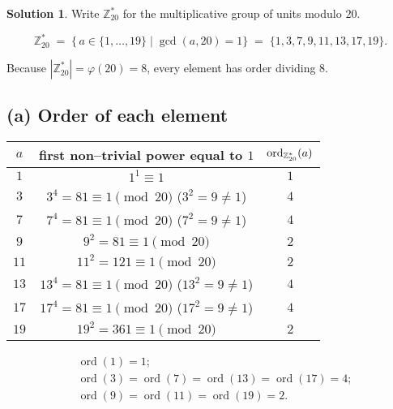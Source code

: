 \documentclass[12pt]{article}
\theoremstyle{definition} %
\newtheorem{solution}{Solution}
\theoremstyle{plain} %
\begin{document}
              \begin{solution}
                Write $\mathbb{Z}_{20}^{\ast}$ for the multiplicative group of units modulo $20$.
                
                \[
                   \mathbb{Z}_{20}^{\ast}
                   \;=\;
                   \{\,a\in\{1,\dots,19\}\mid\gcd(a,20)=1\}
                   \;=\;
                   \{1,3,7,9,11,13,17,19\}.
                \]
                
                Because $|\mathbb{Z}_{20}^{\ast}|=\varphi(20)=8$, every element has order dividing $8$.
                
                \subsection*{(a)  Order of each element}
                
                \vspace{-6pt}
                \renewcommand{\arraystretch}{1.15}
                \begin{center}
                \begin{tabular}{c|c|c}
                $a$ & first non–trivial power equal to $1$ & ${\rm ord}_{\mathbb{Z}_{20}^{\ast}}(a)$\\\hline
                $1$  & $1^{1}\equiv 1$                                     & $1$\\
                $3$  & $3^{4}=81\equiv 1\pmod{20}$ ($3^{2}=9\neq 1$)       & $4$\\
                $7$  & $7^{4}=81\equiv 1\pmod{20}$ ($7^{2}=9\neq 1$)       & $4$\\
                $9$  & $9^{2}=81\equiv 1\pmod{20}$                         & $2$\\
                $11$ & $11^{2}=121\equiv 1\pmod{20}$                       & $2$\\
                $13$ & $13^{4}=81\equiv 1\pmod{20}$ ($13^{2}=9\neq 1$)     & $4$\\
                $17$ & $17^{4}=81\equiv 1\pmod{20}$ ($17^{2}=9\neq 1$)     & $4$\\
                $19$ & $19^{2}=361\equiv 1\pmod{20}$                       & $2$
                \end{tabular}
                \end{center}
                
                \[
                \boxed{
                \begin{aligned}
                &\operatorname{ord}(1)=1;\\
                &\operatorname{ord}(3)=\operatorname{ord}(7)=\operatorname{ord}(13)=\operatorname{ord}(17)=4;\\
                &\operatorname{ord}(9)=\operatorname{ord}(11)=\operatorname{ord}(19)=2.
                \end{aligned}}
                \]
                

\end{solution}
\end{document}
